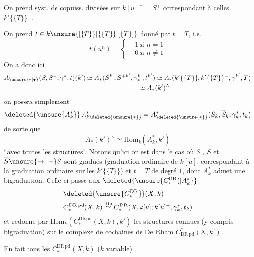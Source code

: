 On prend syst. de copuiss. divisées sur $k[u]^+=S^+$ correspondant à celles   $k'\{\{T\}\}^+$.

On prend $t\in k\unsure{[\{T\}\}|\{\{T\}\}|[\{T\}]}$ donné par $t=T$, i.e.
\[
 t(u^n)=\left\{\begin{aligned} &1\ \text{si }n=1\\ &0\ \text{si }n\neq1\end{aligned}\right.
\]
On a donc ici
\[
\begin{aligned}
 A_{\unsure{*|\bullet}}(S,S^+,\gamma^*,t)(k')&\simeq A_*(S^{k'},S^{+k'},\gamma_*^{k'},t^{k'})
 \simeq A_*(k'\{\{T\}\},k'\{\{T\}\}^+,\gamma^{k'},T)\\
 &\hspace{8em}\simeq A_*(k')^\wedge
\end{aligned}
\]
on posera simplement
\[
 \deleted{\unsure{A_k^*}}\, A_{k\deleted{\unsure{*}}}^*
 = A_{\deleted{\unsure{*}}}^*(S_k,\overline S_k,\gamma_k^*,t_k)
\]
de sorte que
\[
 A_*(k')^\wedge\simeq\mathrm{Hom}_k(A_k^*,k')
\]
``avec toutes les structures''. Notons qu'ici on est dans le cas où $S$ , $\overline S$ et $\overline S\unsure{\to|-}S$ sont gradués (graduation ordinaire de $k[u]$, correspondant à la graduation ordinaire sur les $k'\{\{T\}\}$) et $t=T$ de  degré $1$, donc   $A_k^*$ admet une bigraduation. Celle ci passe aux $\deleted{\unsure{C_*^{\mathrm{DR}}(|A_k^*}}$
\[
\begin{aligned}
 &\deleted{\unsure{C_*^{\mathrm{DR}}}}(X;k)\\
 &C_*^{\mathrm{DR\,pd}}(X,k)\mathrel{\overset{\mathrm{dfn}}{\simeq}}
 C_*^{\mathrm{DR}}(X,k[u];k[u]^+,\gamma_k^*,t_k)
\end{aligned}
\]
et redonne  par $\mathrm{Hom}_k(C_*^{\mathrm{DR\,pd}}(X,k),k')$ les structures connues (y compris bigraduation) sur le complexe de cochaines de De Rham $C_{\mathrm{DR\,pd}}^*(X,k')$.

En fait tous les $C_*^{\mathrm{DR\,pd}}(X,k)$ ($k$ variable)
